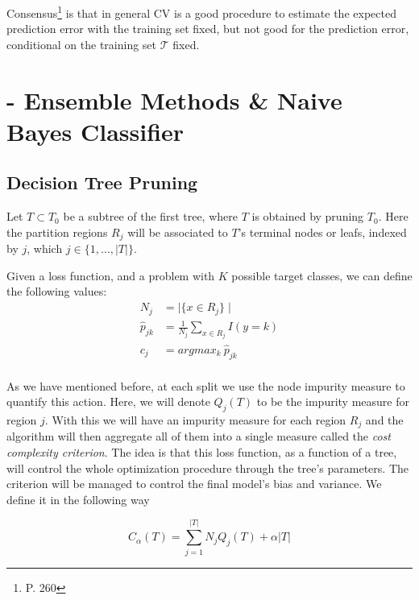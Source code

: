 \begin{appendices}
Consensus\footnote{\textcite{hastie-elemstatslearn} P.
	260} is that in general CV is a good procedure to estimate the expected prediction error with the training set fixed, but not good for the prediction error, conditional on the training set $\mathcal{T}$ fixed.



\chapter{- Ensemble Methods \& Naive Bayes Classifier}\label{appx:ensembleBayes}

\section{Decision Tree Pruning}\label{appx:sec:tree_pruning}

Let $T \subset T_0$ be a subtree of the first tree, where $T$ is obtained by pruning $T_0$. Here the partition regions $R_j$ will be associated to $T$'s terminal nodes or leafs, indexed by $j$, which $j \in \{1,\ldots,|T| \}$.

Given a loss function, and a problem with $K$ possible target classes, we can define the following values:
\begin{equation}
\begin{split}
N_j & = \mid \{x \in R_j \}\mid \\
\hat{p}_{jk} & = \frac{1}{N_j} \sum_{x \in R_j} I(y=k)\\
c_j & = argmax_{k} \ \hat{p}_{jk} \\
\end{split}
\end{equation}\label{eq:decisionTreePruneParameters}

As we have mentioned before, at each split we use the node impurity measure to quantify this action. Here, we will denote $Q_j(T)$ to be the impurity measure for region $j$.
With this we will have an impurity measure for each region $R_j$ and the algorithm will then aggregate all of them into a single measure called the \textit{cost complexity criterion}. The idea is that this loss function, as a function of a tree, will control the whole optimization procedure through the tree's parameters. The criterion will be managed to control the final model's bias and variance. We define it in the following way

\begin{equation}
C_\alpha(T) = \sum_{j=1}^{|T|} N_j Q_j(T) + \alpha|T|
\end{equation}\label{eq:decisionTreeCostComplexity}



\end{appendices}
